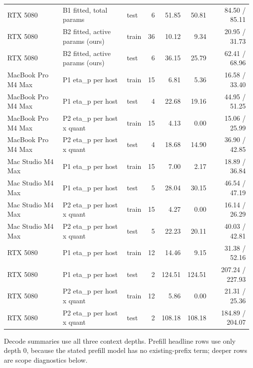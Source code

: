 \documentclass[10pt]{article}
\begin{document}
\begin{center}
\begin{tabular}{lllrrrr}
RTX 5080 & B1 fitted, total params & test & 6 & 51.85 & 50.81 & 84.50 / 85.11 \\
RTX 5080 & B2 fitted, active params (ours) & train & 36 & 10.12 & 9.34 & 20.95 / 31.73 \\
RTX 5080 & B2 fitted, active params (ours) & test & 6 & 36.15 & 25.79 & 62.41 / 68.96 \\
\midrule
MacBook Pro M4 Max & P1 eta\_p per host & train & 15 & 6.81 & 5.36 & 16.58 / 33.40 \\
MacBook Pro M4 Max & P1 eta\_p per host & test & 4 & 22.68 & 19.16 & 44.95 / 51.25 \\
MacBook Pro M4 Max & P2 eta\_p per host x quant & train & 15 & 4.13 & 0.00 & 15.06 / 25.99 \\
MacBook Pro M4 Max & P2 eta\_p per host x quant & test & 4 & 18.68 & 14.90 & 36.90 / 42.85 \\
Mac Studio M4 Max & P1 eta\_p per host & train & 15 & 7.00 & 2.17 & 18.89 / 36.84 \\
Mac Studio M4 Max & P1 eta\_p per host & test & 5 & 28.04 & 30.15 & 46.54 / 47.19 \\
Mac Studio M4 Max & P2 eta\_p per host x quant & train & 15 & 4.27 & 0.00 & 16.14 / 26.29 \\
Mac Studio M4 Max & P2 eta\_p per host x quant & test & 5 & 22.23 & 20.11 & 40.03 / 42.81 \\
RTX 5080 & P1 eta\_p per host & train & 12 & 14.46 & 9.15 & 31.38 / 52.16 \\
RTX 5080 & P1 eta\_p per host & test & 2 & 124.51 & 124.51 & 207.24 / 227.93 \\
RTX 5080 & P2 eta\_p per host x quant & train & 12 & 5.86 & 0.00 & 21.31 / 25.36 \\
RTX 5080 & P2 eta\_p per host x quant & test & 2 & 108.18 & 108.18 & 184.89 / 204.07 \\
\bottomrule
\end{tabular}
\end{center}
Decode summaries use all three context depths. Prefill headline rows use only depth 0, because the stated prefill model has no existing-prefix term; deeper rows are scope diagnostics below.
\end{document}
